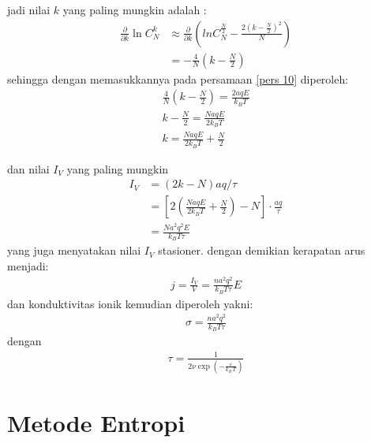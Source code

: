 \documentclass[t]{beamer}
\begin{document}
\begin{frame}
jadi nilai $k$ yang paling mungkin adalah :
\begin{align}
 \frac{\partial}{\partial k} \ln C_N^k & \approx \frac{\partial }{\partial k } \left( ln C_N^{\frac{N}{2}}  - \frac{2 (k - \frac{N}{2})^2}{N} \right)  \\
& = - \frac{4}{N} \left( k - \frac{N}{2}\right)
\end{align}
sehingga dengan memasukkannya pada persamaan \ref{pers 10} diperoleh:
\begin{eqnarray}
\frac{4}{N} \left( k - \frac{N}{2}\right)  = \frac{2 a q E}{k_B T}  \nonumber \\
k - \frac{N}{2} = \frac{N aq E}{2 k_B T} \nonumber \\
k =  \frac{N aq E}{2 k_B T} + \frac{N}{2}
\end{eqnarray} 
\end{frame}

\begin{frame}
dan nilai $I_V$ yang paling mungkin
\begin{align}
I_V  &= ( 2k -N ) aq /\tau \nonumber \\ 
& =\left[ 2 \left( \frac{NaqE}{2 k_B T} + \frac{N}{2} \right)   - N \right] \cdot \frac{aq}{\tau} \nonumber \\ 
&= \frac{Na^2 q^2 E}{k_B  T \tau} 
\end{align}
yang juga menyatakan nilai $I_V$ stasioner. dengan demikian kerapatan arus  menjadi:
\begin{align}
 j = \frac{I_V}{V}  = \frac{n a^2  q^2 }{k_B  T\tau } E
 \end{align}
 dan konduktivitas ionik kemudian diperoleh yakni:
 \begin{align}
\boxed{ \sigma  =  \frac{n a^2  q^2 }{k_B  T \tau}}
 \end{align}
 dengan 
 \begin{align}
 \tau  = \frac{1}{2 \nu  \exp \left(  - \frac{\varepsilon}{k_B \, T}\right)} \nonumber
 \end{align}
\end{frame}

\section{Metode Entropi}
\end{document}
